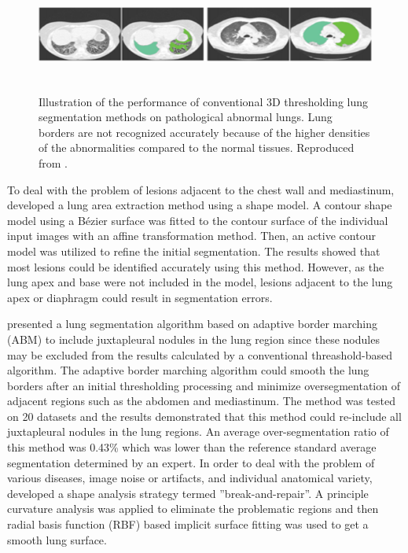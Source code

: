 \begin{figure}[htbp]
  \centering 
  \includegraphics[height=1.5in]{Segmentation/Image/AbnormalLungSegmentation.png}
  \caption{Illustration of the performance of conventional 3D thresholding lung segmentation methods on pathological abnormal lungs. Lung borders are not recognized accurately because of the higher densities of the abnormalities compared to the normal tissues. Reproduced from \citep{van2013automated}.}
  \label{fig:AbnormalLungSegmentation}
\end{figure}

To deal with the problem of lesions adjacent to the chest wall and mediastinum, \citep{kitasaka2003lung} developed a lung area extraction method using a shape model. A contour shape model using a B\'ezier surface was fitted to the contour surface of the individual input images with an affine transformation method. Then, an active contour model was utilized to refine the initial segmentation. The results showed that most lesions could be identified accurately using this method. However, as the lung apex and base were not included in the model, lesions adjacent to the lung apex or diaphragm could result in segmentation errors.

\cite{pu2008adaptive} presented a lung segmentation algorithm based on adaptive border marching (ABM) to include juxtapleural nodules in the lung region since these nodules may be excluded from the results calculated by a conventional threashold-based algorithm. The adaptive border marching algorithm could smooth the lung borders after an initial thresholding processing and minimize oversegmentation of adjacent regions such as the abdomen and mediastinum. The method was tested on 20 datasets and the results demonstrated that this method could re-include all juxtapleural nodules in the lung regions. An average over-segmentation ratio of this method was 0.43\% which was lower than the reference standard average segmentation determined by an expert. In order to deal with the problem of various diseases, image noise or artifacts, and individual anatomical variety, \citep{pu2011shape} developed a shape analysis strategy termed ''break-and-repair''. A principle curvature analysis was applied to eliminate the problematic regions and then radial basis function (RBF) based implicit surface fitting was used to get a smooth lung surface. 

